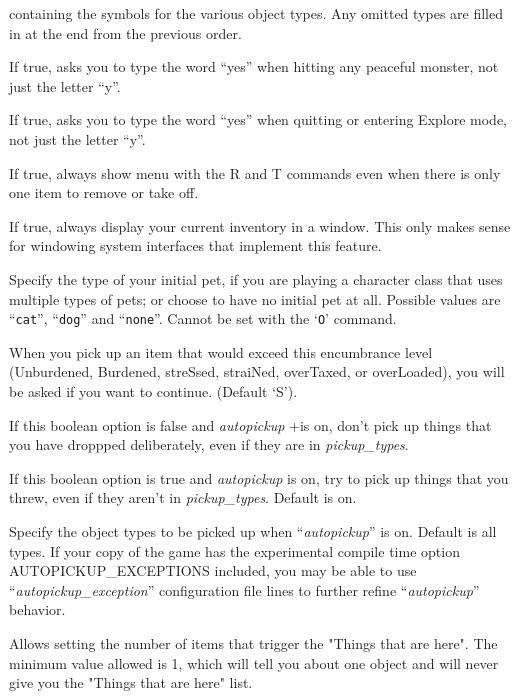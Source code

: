 containing the symbols for the various object types.  Any omitted types
are filled in at the end from the previous order.
\item[\ib{paranoid\_hit}]
If true, asks you to type the word ``yes'' when hitting any peaceful
monster, not just the letter ``y''.
\item[\ib{paranoid\_quit}]
If true, asks you to type the word ``yes'' when quitting or entering
Explore mode, not just the letter ``y''.
\item[\ib{paranoid\_remove}]
If true, always show menu with the R and T commands even when there is
only one item to remove or take off.
\item[\ib{perm\_invent}]
If true, always display your current inventory in a window.  This only
makes sense for windowing system interfaces that implement this feature.
\item[\ib{pettype}]
Specify the type of your initial pet, if you are playing a character class
that uses multiple types of pets; or choose to have no initial pet at all.
Possible values are ``{\tt cat}'', ``{\tt dog}'' and ``{\tt none}''.
Cannot be set with the `{\tt O}' command.
\item[\ib{pickup\_burden}]
When you pick up an item that would exceed this encumbrance
level (Unburdened, Burdened, streSsed, straiNed, overTaxed,
or overLoaded), you will be asked if you want to continue.
(Default `S').
\item[\ib{pickup\_dropped}]
If this boolean option is false and {\it autopickup\/} +is on,
don't pick up things that you have droppped deliberately, even if they
are in {\it pickup\_types\/}.
\item[\ib{pickup\_thrown}]
If this boolean option is true and {\it autopickup\/} is on, try to pick up
things that you threw, even if they aren't in {\it pickup\_types\/}.
Default is on.
\item[\ib{pickup\_types}]
Specify the object types to be picked up when ``{\it autopickup\/}'' 
is on.  Default is all types.  If your copy of the game has the
experimental compile time option AUTOPICKUP\_EXCEPTIONS included,
you may be able to use ``{\it autopickup\_exception\/}'' configuration
file lines to further refine ``{\it autopickup\/}'' behavior.
\item[\ib{pilesize}]
Allows setting the number of items that trigger the "Things that are here".
The minimum value allowed is 1, which will tell you about one object
and will never give you the "Things that are here" list. 
